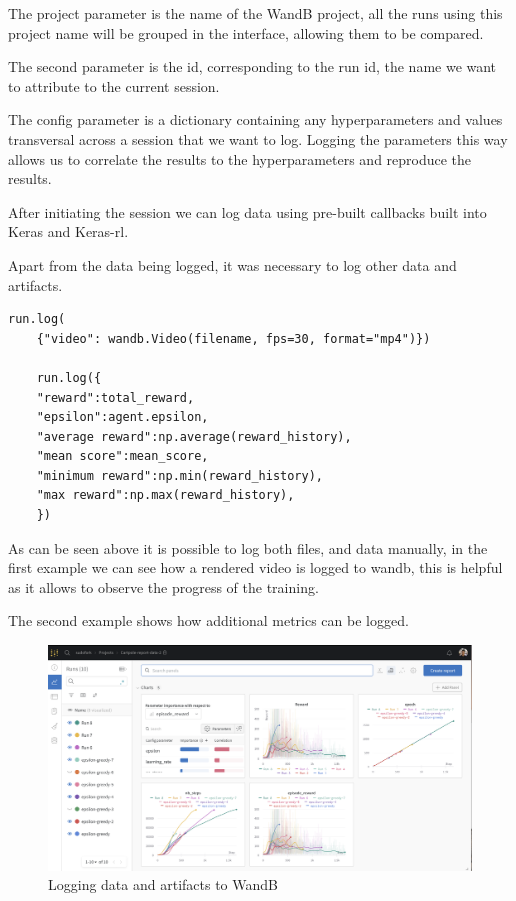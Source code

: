 The project parameter is the name of the WandB project, all the runs using this project name will be grouped in the interface, allowing them to be compared. 

The second parameter is the id, corresponding to the run id, the name we want to attribute to the current session. 

The config parameter is a dictionary containing any hyperparameters and values transversal across a session that we want to log. Logging the parameters this way allows us to correlate the results to the hyperparameters and reproduce the results.

After initiating the session we can log data using pre-built callbacks built into Keras and Keras-rl.

Apart from the data being logged, it was necessary to log other data and artifacts.

\lstset{language=Python}
\lstset{frame=lines}
\lstset{basicstyle=\footnotesize}
\begin{lstlisting}
run.log(
    {"video": wandb.Video(filename, fps=30, format="mp4")})

    run.log({
    "reward":total_reward,
    "epsilon":agent.epsilon,
    "average reward":np.average(reward_history),
    "mean score":mean_score,
    "minimum reward":np.min(reward_history),
    "max reward":np.max(reward_history),
    })
\end{lstlisting}

As can be seen above it is possible to log both files, and data manually, in the first example we can see how a rendered video is logged to wandb, this is helpful as it allows to observe the progress of the training.

The second example shows how additional metrics can be logged.

\begin{figure}[H]
    \centering
    \includegraphics[width=1\textwidth]{figures/wandb.png}
    \caption{Logging data and artifacts to WandB}
\end{figure}

